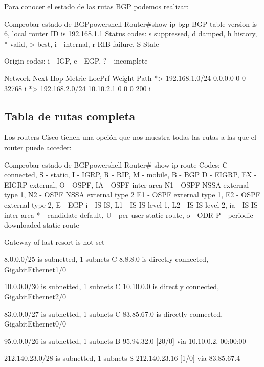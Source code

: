 Para conocer el estado de las rutas BGP podemos realizar:

\begin{mycode}{Comprobar estado de BGP}{powershell}{}
Router#show ip bgp
BGP table version is 6, local router ID is 192.168.1.1
Status codes: s suppressed, d damped, h history, * valid, > best,
              i - internal, r RIB-failure, S Stale

Origin codes: i - IGP, e - EGP, ? - incomplete

Network               Next Hop           Metric LocPrf  Weight  Path
*> 192.168.1.0/24      0.0.0.0                0     0    32768       i
*> 192.168.2.0/24    10.10.2.1                0     0        0   200 i
\end{mycode}

\subsection{Tabla de rutas completa}
Los routers Cisco tienen una opción que nos muestra todas las rutas a las que el router puede acceder:

\begin{mycode}{Comprobar estado de BGP}{powershell}{{\small}}
Router# show ip route
Codes: C - connected, S - static, I - IGRP, R - RIP, M - mobile, B - BGP
    D - EIGRP, EX - EIGRP external, O - OSPF, IA - OSPF inter area
    N1 - OSPF NSSA external type 1, N2 - OSPF NSSA external type 2
    E1 - OSPF external type 1, E2 - OSPF external type 2, E - EGP
    i - IS-IS, L1 - IS-IS level-1, L2 - IS-IS level-2, ia - IS-IS inter area
    * - candidate default, U - per-user static route, o - ODR
    P - periodic downloaded static route

Gateway of last resort is not set

        8.0.0.0/25 is subnetted, 1 subnets
C       8.8.8.0 is directly connected, GigabitEthernet1/0

        10.0.0.0/30 is subnetted, 1 subnets
C       10.10.0.0 is directly connected, GigabitEthernet2/0

        83.0.0.0/27 is subnetted, 1 subnets
C       83.85.67.0 is directly connected, GigabitEthernet0/0

        95.0.0.0/26 is subnetted, 1 subnets
B       95.94.32.0 [20/0] via 10.10.0.2, 00:00:00

        212.140.23.0/28 is subnetted, 1 subnets
S       212.140.23.16 [1/0] via 83.85.67.4
\end{mycode}

